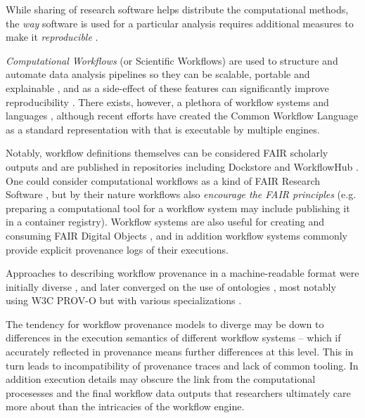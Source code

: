 While sharing of research software helps distribute the computational methods, the \emph{way} software is used for a particular analysis requires additional measures to make it \emph{reproducible} \cite{Stodden 2016,Sandve 2013}.

\emph{Computational Workflows} (or Scientific Workflows) are used to structure and automate data analysis pipelines so they can be scalable, portable and explainable \cite{Atkinson 2017}, and as a side-effect of these features can significantly improve reproducibility \cite{Cohen-Boulakia 2017}. 
There exists, however, a plethora of workflow systems and languages \cite{Leipzig 2021,Amstutz 2021}, although recent efforts have created the Common Workflow Language \cite{Crusoe 2022} as a standard representation with  that is executable by multiple engines. 

Notably, workflow definitions themselves can be considered FAIR scholarly outputs \cite{Goble 2020} and are published in repositories including Dockstore \cite{Yuen 2021} and WorkflowHub \cite{Goble 2021}.
One could consider computational workflows as a kind of FAIR Research Software \cite{de Visser 2023}, but by their nature workflows also \emph{encourage the FAIR principles} (e.g. preparing a computational tool for a workflow system \cite{Brack 2022a} may include publishing it in a container registry). Workflow systems are also useful for creating and consuming FAIR Digital Objects \cite{Wittenburg 2022b}, and in addition workflow systems commonly provide explicit provenance logs of their executions.

Approaches to describing workflow provenance in a machine-readable format were initially diverse \cite{Cruz 2009}, and later converged on the use of ontologies \cite{Missier 2010}, most notably using W3C PROV-O \cite{Lebo 2013a} but with various specializations \cite{Garijo 2011,Garijo 2012,Missier 2013,Belhajjame 2015,Cuevas-Vicenttín 2016}. 

The tendency for workflow provenance models to diverge may be down to differences in the execution semantics of different workflow systems -- which if accurately reflected in provenance means further differences at this level. This in turn leads to incompatibility of provenance traces and lack of common tooling. In addition execution details may obscure the link from the computational procesesses and the final workflow data outputs that researchers ultimately care more about than the intricacies of the workflow engine.

